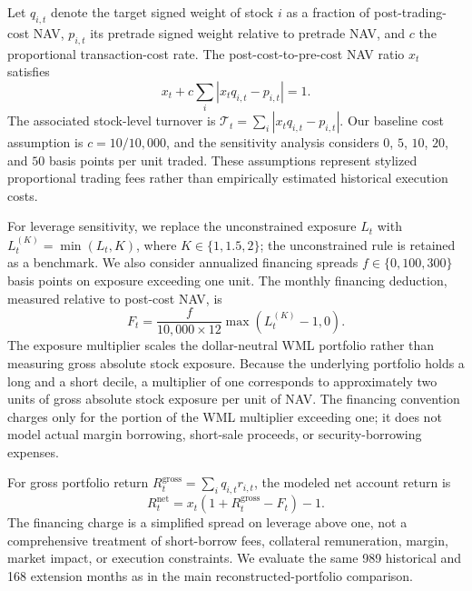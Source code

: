 \documentclass[11pt]{article}
\begin{document}
Let $q_{i,t}$ denote the target signed weight of stock $i$ as a fraction of post-trading-cost NAV, $p_{i,t}$ its pretrade signed weight relative to pretrade NAV, and $c$ the proportional transaction-cost rate. The post-cost-to-pre-cost NAV ratio $x_t$ satisfies
\begin{equation}
 x_t+c\sum_i\left|x_tq_{i,t}-p_{i,t}\right|=1.
 \label{eq:self_financing_cost}
\end{equation}
The associated stock-level turnover is $\mathcal{T}_t=\sum_i|x_tq_{i,t}-p_{i,t}|$. Our baseline cost assumption is $c=10/10{,}000$, and the sensitivity analysis considers $0$, $5$, $10$, $20$, and $50$ basis points per unit traded. These assumptions represent stylized proportional trading fees rather than empirically estimated historical execution costs.

For leverage sensitivity, we replace the unconstrained exposure $L_t$ with $L_t^{(K)}=\min(L_t,K)$, where $K\in\{1,1.5,2\}$; the unconstrained rule is retained as a benchmark. We also consider annualized financing spreads $f\in\{0,100,300\}$ basis points on exposure exceeding one unit. The monthly financing deduction, measured relative to post-cost NAV, is
\begin{equation}
 F_t=\frac{f}{10{,}000\times12}\max\left(L_t^{(K)}-1,0\right).
 \label{eq:financing}
\end{equation}
The exposure multiplier scales the dollar-neutral WML portfolio rather than measuring gross absolute stock exposure. Because the underlying portfolio holds a long and a short decile, a multiplier of one corresponds to approximately two units of gross absolute stock exposure per unit of NAV. The financing convention charges only for the portion of the WML multiplier exceeding one; it does not model actual margin borrowing, short-sale proceeds, or security-borrowing expenses.

For gross portfolio return $R_t^{\mathrm{gross}}=\sum_iq_{i,t}r_{i,t}$, the modeled net account return is
\begin{equation}
 R_t^{\mathrm{net}}=x_t\left(1+R_t^{\mathrm{gross}}-F_t\right)-1.
 \label{eq:net_account_return}
\end{equation}
The financing charge is a simplified spread on leverage above one, not a comprehensive treatment of short-borrow fees, collateral remuneration, margin, market impact, or execution constraints. We evaluate the same 989 historical and 168 extension months as in the main reconstructed-portfolio comparison.
\end{document}
